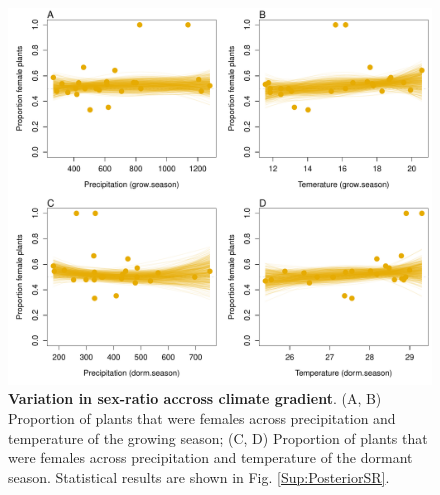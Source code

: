 \documentclass[12pt]{article}
\begin{document}
\begin{figure}[H]
  \begin{center}
    \includegraphics[width=0.95\linewidth]{Figures/gardens_SR.pdf}
  \caption{\textbf{Variation in sex-ratio accross climate gradient}.
  (A, B) Proportion of plants that were females across precipitation and temperature of the growing season; (C, D) Proportion of plants that were females across precipitation and temperature of the dormant season.
  Statistical results are shown in Fig. \ref{Sup:PosteriorSR}.}
  \label{Sup:gardens_SR}
  \end{center}
\end{figure}
\end{document}

